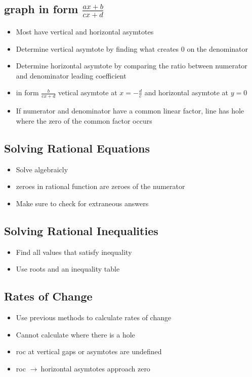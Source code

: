 \documentclass{article}
\newcommand{\rt}{$\to\ $}
\begin{document}
    \subsection{graph in form $\frac{ax+b}{cx+d}$}
    \begin{itemize}
        \item Most have vertical and horizontal asymtotes
        \item Determine vertical asymtote by finding what creates 0 on the denominator
        \item Determine horizontal asymtote by comparing the ratio between numerator and denominator leading coefficient
        \item in form $\frac{b}{cx+d}$ vetical asymtote at $x = -\frac{d}{c}$ and horizontal asymtote at $y=0$
        \item If numerator and denominator have a common linear factor, line has hole where the zero of the common factor occurs
    \end{itemize}

    \subsection{Solving Rational Equations}
    \begin{itemize}
        \item Solve algebraicly
        \item zeroes in rational function are zeroes of the numerator
        \item Make sure to check for extraneous answers
    \end{itemize}

    \subsection{Solving Rational Inequalities}
    \begin{itemize}
        \item Find all values that satisfy inequality
        \item Use roots and an inequality table
    \end{itemize}

    \subsection{Rates of Change}
    \begin{itemize}
        \item Use previous methods to calculate rates of change
        \item Cannot calculate where there is a hole
        \item roc at vertical gaps or asymtotes are undefined
        \item roc \rt horizontal asymtotes approach zero
    \end{itemize}
\end{document}
